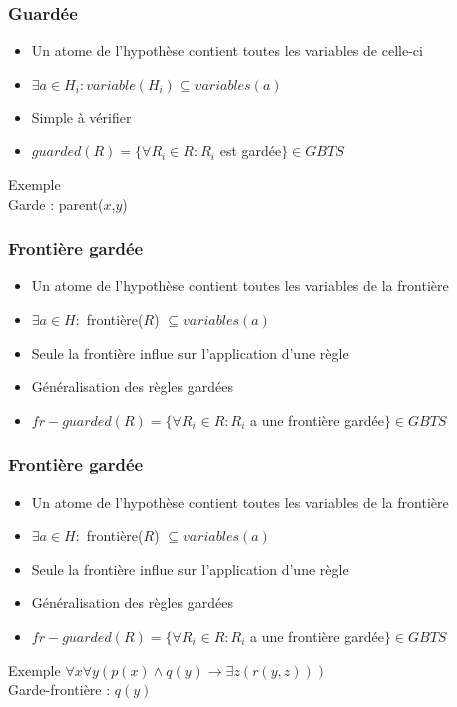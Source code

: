 \begin{frame}
	\frametitle{Guardée}
	\begin{itemize}
		\item Un atome de l'hypothèse contient toutes les variables de celle-ci
		\item $\exists a \in H_i : variable(H_i) \subseteq variables(a)$
		\item Simple à vérifier
		\item $guarded(R) = \{\forall R_i \in R : R_i $ est gardée$\} \in GBTS$
	\end{itemize}
	\vspace{10mm}
	\begin{exampleblock}{Exemple}
		 \\
		Garde : parent($x$,$y$)
	\end{exampleblock}
\end{frame}

\begin{frame}
	\frametitle{Frontière gardée}
	\begin{itemize}
		\item Un atome de l'hypothèse contient toutes les variables de la frontière
		\item $\exists a \in H :$ frontière($R$) $\subseteq variables(a)$
		\item Seule la frontière influe sur l'application d'une règle
		\item Généralisation des règles gardées
		\item $fr-guarded(R) = \{\forall R_i \in R : R_i $ a une frontière gardée$\} \in GBTS$
	\end{itemize}
	\vspace{10mm}
\end{frame}

\begin{frame}
	\frametitle{Frontière gardée}
	\begin{itemize}
		\item Un atome de l'hypothèse contient toutes les variables de la frontière
		\item $\exists a \in H :$ frontière($R$) $\subseteq variables(a)$
		\item Seule la frontière influe sur l'application d'une règle
		\item Généralisation des règles gardées
		\item $fr-guarded(R) = \{\forall R_i \in R : R_i $ a une frontière gardée$\} \in GBTS$
	\end{itemize}
	\vspace{10mm}
	\begin{exampleblock}{Exemple}
		$\forall x \forall y (p(x) \wedge q(y) \rightarrow \exists z (r(y,z)))$\\
		Garde-frontière : $q(y)$
	\end{exampleblock}
\end{frame}

